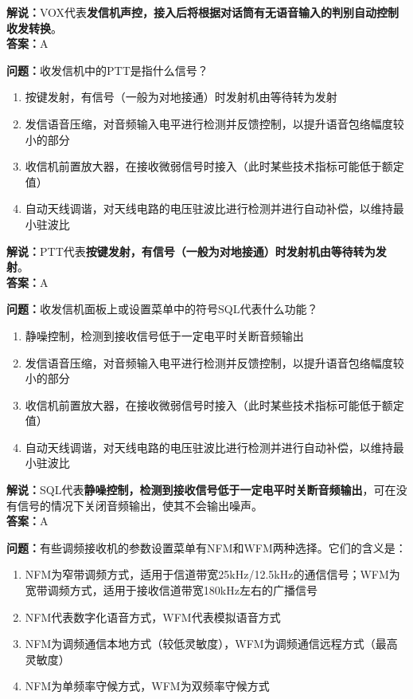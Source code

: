 \textbf{解说：}VOX代表\textbf{发信机声控，接入后将根据对话筒有无语音输入的判别自动控制收发转换}。\\\textbf{答案：}A%



\textbf{问题：}收发信机中的PTT是指什么信号？

\begin{enumerate}[label=\Alph*), leftmargin=1cm]
	\item 按键发射，有信号（一般为对地接通）时发射机由等待转为发射
	\item 发信语音压缩，对音频输入电平进行检测并反馈控制，以提升语音包络幅度较小的部分
	\item 收信机前置放大器，在接收微弱信号时接入（此时某些技术指标可能低于额定值）
	\item 自动天线调谐，对天线电路的电压驻波比进行检测并进行自动补偿，以维持最小驻波比
\end{enumerate}

\textbf{解说：}PTT代表\textbf{按键发射，有信号（一般为对地接通）时发射机由等待转为发射}。\\\textbf{答案：}A%



\textbf{问题：}收发信机面板上或设置菜单中的符号SQL代表什么功能？

\begin{enumerate}[label=\Alph*), leftmargin=1cm]
	\item 静噪控制，检测到接收信号低于一定电平时关断音频输出
	\item 发信语音压缩，对音频输入电平进行检测并反馈控制，以提升语音包络幅度较小的部分
	\item 收信机前置放大器，在接收微弱信号时接入（此时某些技术指标可能低于额定值）
	\item 自动天线调谐，对天线电路的电压驻波比进行检测并进行自动补偿，以维持最小驻波比
\end{enumerate}

\textbf{解说：}SQL代表\textbf{静噪控制，检测到接收信号低于一定电平时关断音频输出}，可在没有信号的情况下关闭音频输出，使其不会输出噪声。\\\textbf{答案：}A%



\textbf{问题：}有些调频接收机的参数设置菜单有NFM和WFM两种选择。它们的含义是：

\begin{enumerate}[label=\Alph*), leftmargin=1cm]
	\item NFM为窄带调频方式，适用于信道带宽25kHz/12.5kHz的通信信号；WFM为宽带调频方式，适用于接收信道带宽180kHz左右的广播信号
	\item NFM代表数字化语音方式，WFM代表模拟语音方式
	\item NFM为调频通信本地方式（较低灵敏度），WFM为调频通信远程方式（最高灵敏度）
	\item NFM为单频率守候方式，WFM为双频率守候方式
\end{enumerate}

